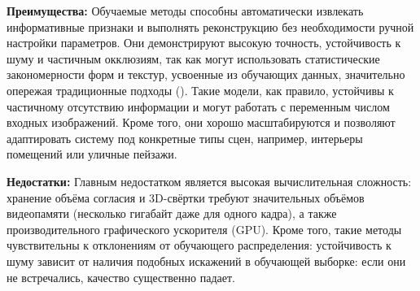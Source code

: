 \textbf{Преимущества:}
Обучаемые методы способны автоматически извлекать информативные признаки и
выполнять реконструкцию без необходимости ручной настройки параметров. Они
демонстрируют высокую точность, устойчивость к шуму и частичным окклюзиям, так
как могут использовать статистические закономерности форм и текстур, усвоенные
из обучающих данных, значительно опережая традиционные подходы
(\cite{10.1109/CVPR.2017.272}). Такие модели, как правило, устойчивы к
частичному отсутствию информации и могут работать с переменным числом входных
изображений. Кроме того, они хорошо масштабируются и позволяют адаптировать
систему под конкретные типы сцен, например, интерьеры помещений или уличные
пейзажи.

\textbf{Недостатки:}
Главным недостатком является высокая вычислительная сложность: хранение объёма
согласия и 3D-свёртки требуют значительных объёмов видеопамяти (несколько
гигабайт даже для одного кадра), а также производительного графического
ускорителя (GPU). Кроме того, такие методы чувствительны к отклонениям от
обучающего распределения: устойчивость к шуму зависит от наличия подобных
искажений в обучающей выборке: если они не встречались, качество существенно
падает.

